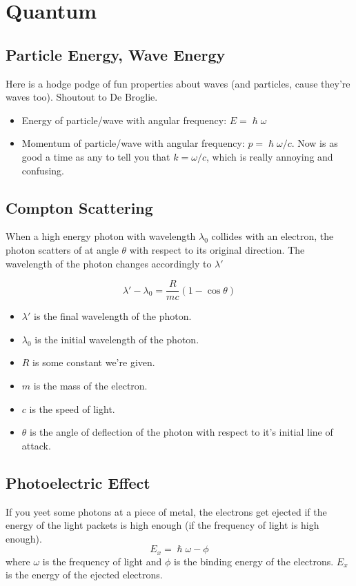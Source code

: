 \documentclass[a4paper,12pt]{report}
\begin{document}
\chapter{Quantum}
\section{Particle Energy, Wave Energy}
Here is a hodge podge of fun properties about waves (and particles, cause they're waves too). Shoutout to De Broglie.
\begin{itemize}
\item Energy of particle/wave with angular frequency: $E = \hslash \omega$
\item Momentum of particle/wave with angular frequency: $p = \hslash \omega/c$. Now is as good a time as any to tell you that $k=\omega/c$, which is really annoying and confusing.
\end{itemize}

\section{Compton Scattering}
When a high energy photon with wavelength $\lambda_0$ collides with an electron, the photon scatters of at angle $\theta$ with respect to its original direction. The wavelength of the photon 
changes accordingly to $\lambda'$

$$\lambda' - \lambda_0 = \frac{R}{mc}(1-\cos\theta)$$
\begin{itemize}
\item $\lambda'$ is the final wavelength of the photon.
\item $\lambda_0$ is the initial wavelength of the photon.
\item $R$ is some constant we're given.
\item $m$ is the mass of the electron.
\item $c$ is the speed of light.
\item $\theta$ is the angle of deflection of the photon with respect to it's initial line of attack.
\end{itemize}

\section{Photoelectric Effect}
If you yeet some photons at a piece of metal, the electrons get ejected if the energy of the light packets is high enough (if the frequency of light is high enough).
$$E_x = \hslash \omega - \phi$$
where $\omega$ is the frequency of light and $\phi$ is the binding energy of the electrons. $E_x$ is the energy of the ejected electrons.
\end{document}
